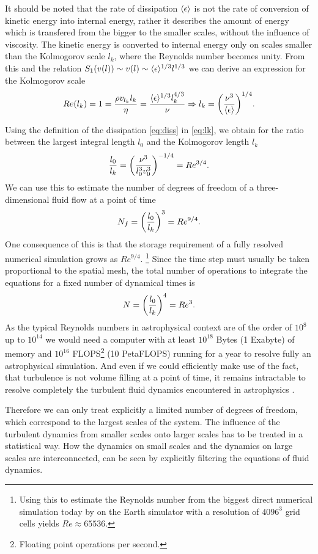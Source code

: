 It should be noted that the rate of dissipation $\langle \epsilon \rangle$ is not the rate
of conversion of kinetic energy into internal energy, rather it describes the
amount
of energy which is transfered from the bigger to the smaller scales, without
the influence of viscosity. The kinetic energy is converted to internal energy
only on scales smaller than the Kolmogorov scale $l_k$, where the
Reynolds number becomes unity. From this and the relation $S_1(v(l)) \sim v(
l) \sim \langle \epsilon \rangle^{1/3} l^{1/3}$ we can derive an expression for the
Kolmogorov scale
\begin{align}
Re(l_k) = 1 = \frac{\rho v_{l_k} l_k}{\eta} = 
\frac{\langle \epsilon \rangle^{1/3} l_k^{4/3}}{\nu} \Rightarrow
l_k = { \left( \frac{\nu^3}{\langle \epsilon \rangle} \right) }^{1/4}. \label{eq:lk}
\end{align}

Using the definition of the dissipation \eqref{eq:diss} in \eqref{eq:lk}, we
obtain for the ratio between the largest integral length $l_0$ and the
Kolmogorov length $l_k$
\begin{align}
\frac{l_0}{l_k}={ \left( \frac{\nu^3}{l_0^3 v_0^3} \right) }^{-1/4} = Re^{3/4}. 
\end{align}
We can use this to estimate the number of degrees of freedom of a
three-dimensional fluid flow at a point of time
\begin{align}
N_f={ \left( \frac{l_0}{l_k} \right) }^3 = Re^{9/4}.
\end{align}
One consequence of this is that the storage requirement of a fully resolved
numerical simulation grows as $Re^{9/4}$. \footnote{
Using this to estimate the Reynolds number from the biggest direct numerical
simulation today by \citet{Yokokawa2002} on the Earth simulator with a
resolution of $4096^3$ grid cells yields $Re \approx 65536$.} Since the time
step must usually be taken proportional to the spatial mesh, the total number
of operations to integrate the equations for a fixed number of dynamical times
is
\begin{align}
N = { \left( \frac{l_0}{l_k} \right) }^4 = Re^3.
\end{align}
As the typical Reynolds numbers in astrophysical context are of the order of
$10^8$ \citep{Kritsuk2007} up to $10^{14}$ \citep{Schmidt2006} we would
need a computer with at least $10^{18}$ Bytes (1 Exabyte) of memory and
$10^{16}$ FLOPS\footnote{Floating point operations per second.} (10 PetaFLOPS)
running for a year to resolve fully an astrophysical simulation. And even
if we could efficiently make use of the fact, that turbulence is not volume
filling at a
point of time, it remains intractable to resolve completely the turbulent
fluid dynamics encountered in astrophysics \citep{Schmidt2006}.

Therefore we can only treat explicitly a limited number of degrees of freedom,
which correspond to the largest scales of the system. The influence of the
turbulent dynamics from smaller scales onto larger scales has to be treated in a
statistical way. How the dynamics on small scales and the dynamics on large
scales are interconnected, can be seen by explicitly filtering the equations of
fluid dynamics.

  